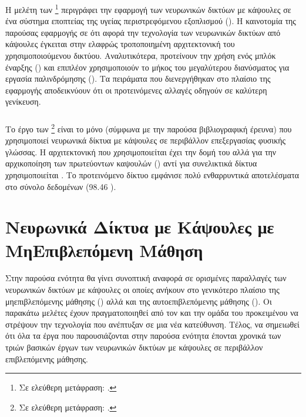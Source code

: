 Η μελέτη των  \footnote{Σε ελεύθερη μετάφραση: .} \cite{zhu2019convolutional} περιγράφει την εφαρμογή των νευρωνικών δικτύων με κάψουλες σε ένα σύστημα εποπτείας της υγείας περιστρεφόμενου εξοπλισμού (). Η καινοτομία της παρούσας εφαρμογής σε ότι αφορά την τεχνολογία των νευρωνικών δικτύων από κάψουλες έγκειται στην ελαφρώς τροποποιημένη αρχιτεκτονική του χρησιμοποιούμενου δικτύου. Αναλυτικότερα, προτείνουν την χρήση ενός μπλόκ έναρξης () και επιπλέον χρησιμοποιούν το μήκος του μεγαλύτερου διανύσματος για εργασία παλινδρόμησης (). Τα πειράματα που διενεργήθηκαν στο πλαίσιο της εφαρμογής αποδεικνύουν ότι οι προτεινόμενες αλλαγές οδηγούν σε καλύτερη γενίκευση.


\subsubsection{}

Το έργο των  \footnote{Σε ελεύθερη μετάφραση: .} \cite{srivastava2018identifying} είναι το μόνο (σύμφωνα με την παρούσα βιβλιογραφική έρευνα) που χρησιμοποιεί νευρωνικά δίκτυα με κάψουλες σε περιβάλλον επεξεργασίας φυσικής γλώσσας. Η αρχιτεκτονική που χρησιμοποιείται έχει την δομή του \cite{sabour2017dynamic} αλλά για την αρχικοποίηση των πρωτεύοντων καψουλών () αντί για συνελικτικά δίκτυα χρησιμοποιείται . Το προτεινόμενο δίκτυο εμφάνισε πολύ ενθαρρυντικά αποτελέσματα στο σύνολο δεδομένων  (98.46 ).


\section{Νευρωνικά Δίκτυα με Κάψουλες με Μη\textendash Επιβλεπόμενη Μάθηση}

Στην παρούσα ενότητα θα γίνει συνοπτική αναφορά σε ορισμένες παραλλαγές των νευρωνικών δικτύων με κάψουλες οι οποίες ανήκουν στο γενικότερο πλαίσιο της μη\textendash επιβλεπόμενης μάθησης () αλλά και της αυτο\textendash επιβλεπόμενης μάθησης (). Οι παρακάτω μελέτες έχουν πραγματοποιηθεί από τον  και την ομάδα του προκειμένου να στρέψουν την τεχνολογία που ανέπτυξαν σε μια νέα κατεύθυνση. Τέλος, να σημειωθεί ότι όλα τα έργα που παρουσιάζονται στην παρούσα ενότητα έπονται χρονικά των τριών βασικών έργων των νευρωνικών δικτύων με κάψουλες σε περιβάλλον επιβλεπόμενης μάθησης.

